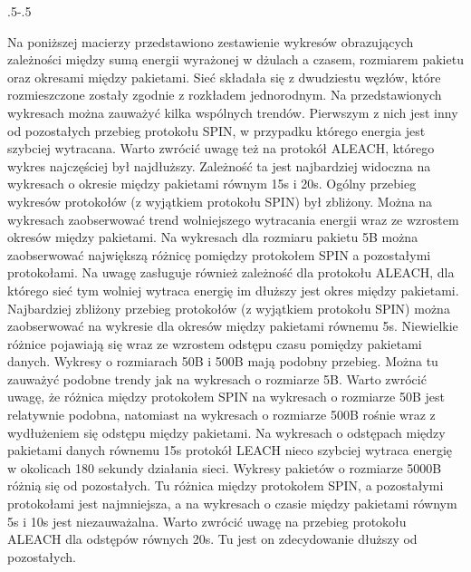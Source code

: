 \clearpage
\thispagestyle{empty}

{\pdfpagewidth
    \vspace*{-2cm}
    \noindent\kern.5\pdfpagewidth{}\kern-.5\pdfpagewidth
     \par
     \vspace*{-5cm}
\clearpage
}

Na poniższej macierzy przedstawiono zestawienie wykresów obrazujących zależności między sumą energii wyrażonej w dżulach a czasem, rozmiarem pakietu oraz okresami między pakietami. Sieć składała się z dwudziestu węzłów, które rozmieszczone zostały zgodnie z rozkładem jednorodnym.
Na przedstawionych wykresach można zauważyć kilka wspólnych trendów. Pierwszym z nich jest inny od pozostałych przebieg protokołu SPIN, w przypadku którego energia jest szybciej wytracana. Warto zwrócić uwagę też na protokół ALEACH, którego wykres najczęściej był najdłuższy. Zależność ta jest najbardziej widoczna na wykresach o okresie między pakietami równym 15s i 20s. Ogólny przebieg wykresów protokołów (z wyjątkiem protokołu SPIN) był zbliżony. Można na wykresach zaobserwować trend wolniejszego wytracania energii wraz ze wzrostem okresów między pakietami.
Na wykresach dla rozmiaru pakietu 5B można zaobserwować największą różnicę pomiędzy protokołem SPIN a pozostałymi protokołami. Na uwagę zasługuje również zależność dla protokołu ALEACH, dla którego sieć tym wolniej wytraca energię im dłuższy jest okres między pakietami. Najbardziej zbliżony przebieg protokołów (z wyjątkiem protokołu SPIN) można zaobserwować na wykresie dla okresów między pakietami równemu 5s. Niewielkie różnice pojawiają się wraz ze wzrostem odstępu czasu pomiędzy pakietami danych. 
Wykresy o rozmiarach 50B i 500B mają podobny przebieg. Można tu zauważyć podobne trendy jak na wykresach o rozmiarze 5B. Warto zwrócić uwagę, że różnica między protokołem SPIN na wykresach o rozmiarze 50B jest relatywnie podobna, natomiast na wykresach o rozmiarze 500B rośnie wraz z wydłużeniem się odstępu między pakietami. Na wykresach o odstępach między pakietami danych równemu 15s protokół LEACH nieco szybciej wytraca energię w okolicach 180 sekundy działania sieci. 
Wykresy pakietów o rozmiarze 5000B różnią się od pozostałych. Tu różnica między protokołem SPIN, a pozostałymi protokołami jest najmniejsza, a na wykresach o czasie między pakietami równym 5s i 10s jest niezauważalna. Warto zwrócić uwagę na przebieg protokołu ALEACH dla odstępów równych 20s. Tu jest on zdecydowanie dłuższy od pozostałych. 

